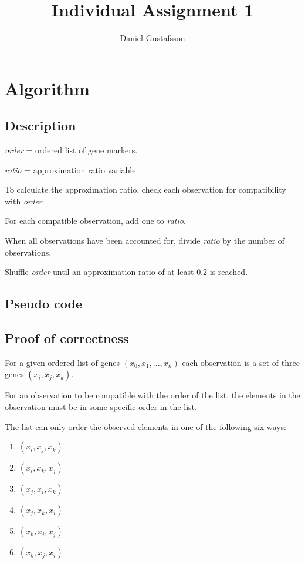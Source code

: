 \documentclass[11pt, a4paper]{article}
\title{Individual Assignment 1}
\author{Daniel Gustafsson}
\begin{document}
\maketitle	

\section{Algorithm}
\subsection{Description}
\noindent\textit{order} = ordered list of gene markers.

\noindent\textit{ratio} = approximation ratio variable.

\vspace{2mm}
To calculate the approximation ratio, check each observation
for compatibility with \textit{order}.

For each compatible observation, add one to \textit{ratio}.

When all observations have been accounted for, divide \textit{ratio}
by the number of observations.

Shuffle \textit{order} until an approximation
ratio of at least 0.2 is reached.

\subsection{Pseudo code}


\subsection{Proof of correctness}
For a given ordered list of genes $(x_0, x_1, ... , x_n)$ each
observation is a set of three genes $(x_i, x_j, x_k)$.

For an observation to be compatible with the order of the list,
the elements in the observation must be in some specific order
in the list.

The list can only order the observed elements in one of
the following six ways:

\begin{enumerate}
\item $(x_i, x_j, x_k)$

\item $(x_i, x_k, x_j)$

\item $(x_j, x_i, x_k)$

\item $(x_j, x_k, x_i)$

\item $(x_k, x_i, x_j)$

\item $(x_k, x_j, x_i)$
\end{enumerate}
\end{document}
